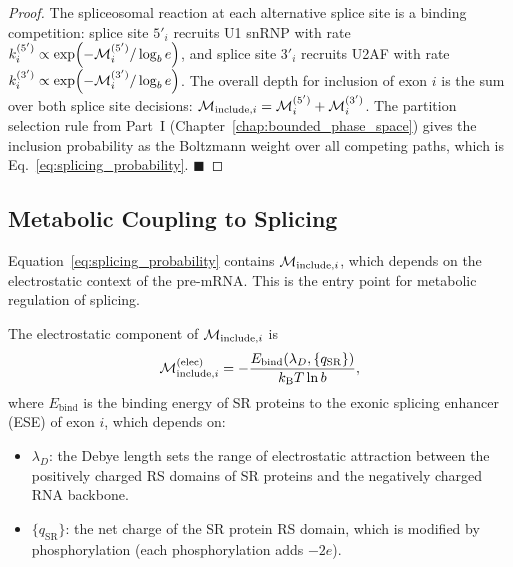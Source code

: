 \begin{proof}
The spliceosomal reaction at each alternative splice site is a binding
competition: splice site $5'_{i}$ recruits U1 snRNP with rate
$k_{i}^{(5')} \propto \exp(-\mathcal{M}_{i}^{(5')}/\log_b e)$, and splice site
$3'_{i}$ recruits U2AF with rate
$k_{i}^{(3')} \propto \exp(-\mathcal{M}_{i}^{(3')}/\log_b e)$.
The overall depth for inclusion of exon $i$ is the sum over both splice site
decisions:
$\mathcal{M}_{\mathrm{include},i} = \mathcal{M}_i^{(5')} + \mathcal{M}_i^{(3')}$.
The partition selection rule from Part~I
(Chapter~\ref{chap:bounded_phase_space}) gives the inclusion probability as
the Boltzmann weight over all competing paths, which is
Eq.~\eqref{eq:splicing_probability}. $\blacksquare$
\end{proof}

\subsection{Metabolic Coupling to Splicing}
\label{subsec:splicing_metabolic}

Equation~\eqref{eq:splicing_probability} contains $\mathcal{M}_{\mathrm{include},i}$,
which depends on the electrostatic context of the pre-mRNA. This is the entry
point for metabolic regulation of splicing.

\begin{proposition}
\label{prop:splice_depth_modulation}
The electrostatic component of $\mathcal{M}_{\mathrm{include},i}$ is
\begin{equation}
  \mathcal{M}_{\mathrm{include},i}^{(\mathrm{elec})} =
  -\frac{E_{\mathrm{bind}}(\lambda_D, \{q_{\mathrm{SR}}\})}{k_{\mathrm{B}} T \ln b},
  \label{eq:splice_elec_depth}
\end{equation}
where $E_{\mathrm{bind}}$ is the binding energy of SR proteins to the exonic
splicing enhancer (ESE) of exon $i$, which depends on:
\begin{itemize}
  \item $\lambda_D$: the Debye length sets the range of electrostatic attraction
        between the positively charged RS domains of SR proteins and the
        negatively charged RNA backbone.
  \item $\{q_{\mathrm{SR}}\}$: the net charge of the SR protein RS domain,
        which is modified by phosphorylation (each phosphorylation adds $-2e$).
\end{itemize}
\end{proposition}

